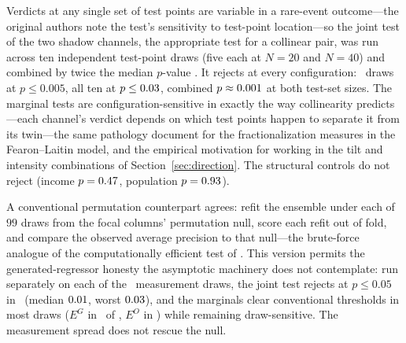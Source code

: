 Verdicts at any single set of test points are variable in a rare-event
outcome---the original authors note the test's sensitivity to test-point
location---so the joint test of the two shadow channels, the appropriate
test for a collinear pair, was run across ten independent test-point draws
(five each at $N = 20$ and $N = 40$) and combined by twice the median
$p$-value \citep{meinshausen2009}.  It rejects at every configuration:
\MhJointTight\ draws at $p \le 0.005$, all ten at $p \le 0.03$,
combined $p \approx 0.001$ at both test-set sizes.  The marginal
tests are configuration-sensitive in exactly the way collinearity
predicts---each channel's verdict depends on which test points happen to
separate it from its twin---the same pathology \citet{mcalexandermentch2020}
document for the fractionalization measures in the Fearon--Laitin model, and
the empirical motivation for working in the tilt and intensity combinations
of Section~\ref{sec:direction}.  The structural controls do not reject
(income $p = 0.47$, population $p = 0.93$).

A conventional permutation counterpart agrees: refit the ensemble under each
of $99$ draws from the focal columns' permutation null, score each refit out
of fold, and compare the observed average precision to that null---the
brute-force analogue of the computationally efficient test of
\citet{coleman2022}.  This version permits the generated-regressor honesty
the asymptotic machinery does not contemplate: run separately on each of the
\PdDraws\ measurement draws, the joint test rejects at $p \le 0.05$ in
\PdJointDraws\ (median $0.01$, worst $0.03$), and the marginals
clear conventional thresholds in most draws ($E^G$ in \PdEgovHits\ of
\PdDraws, $E^O$ in \PdEoppHits) while remaining draw-sensitive.  The
measurement spread does not rescue the null.
